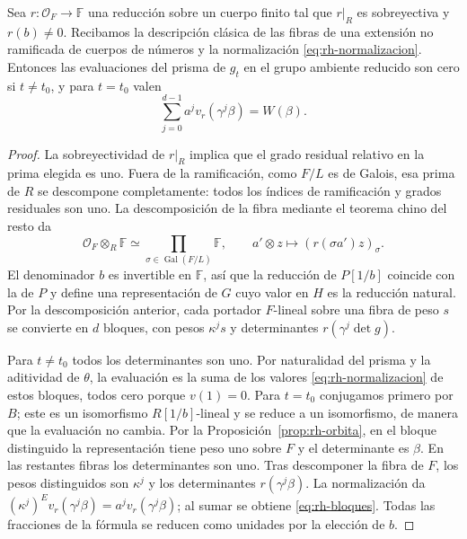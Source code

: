 \begin{proposicion}
\label{prop:rh-reduccion}
Sea $r:\mathcal O_F\to\mathbb F$ una reducción sobre un cuerpo finito tal que $r|_R$ es sobreyectiva y $r(b)\ne0$. Recibamos la descripción clásica de las fibras de una extensión no ramificada de cuerpos de números y la normalización \eqref{eq:rh-normalizacion}. Entonces las evaluaciones del prisma de $g_t$ en el grupo ambiente reducido son cero si $t\ne t_0$, y para $t=t_0$ valen
\begin{equation}
 \sum_{j=0}^{d-1}a^j v_r(\gamma^j\beta)=W(\beta).
 \label{eq:rh-bloques}
\end{equation}
\end{proposicion}
\begin{proof}
La sobreyectividad de $r|_R$ implica que el grado residual relativo en la prima elegida es uno. Fuera de la ramificación, como $F/L$ es de Galois, esa prima de $R$ se descompone completamente: todos los índices de ramificación y grados residuales son uno. La descomposición de la fibra mediante el teorema chino del resto da
\[
 \mathcal O_F\otimes_R\mathbb F\simeq
 \prod_{\sigma\in\operatorname{Gal}(F/L)}\mathbb F,
 \qquad a'\otimes z\longmapsto (r(\sigma a')z)_\sigma.
\]
El denominador $b$ es invertible en $\mathbb F$, así que la reducción de $P[1/b]$ coincide con la de $P$ y define una representación de $G$ cuyo valor en $H$ es la reducción natural. Por la descomposición anterior, cada portador $F$-lineal sobre una fibra de peso $s$ se convierte en $d$ bloques, con pesos $\kappa^j s$ y determinantes $r(\gamma^j\det g)$.

Para $t\ne t_0$ todos los determinantes son uno. Por naturalidad del prisma y la aditividad de $\theta$, la evaluación es la suma de los valores \eqref{eq:rh-normalizacion} de estos bloques, todos cero porque $v(1)=0$. Para $t=t_0$ conjugamos primero por $B$; este es un isomorfismo $R[1/b]$-lineal y se reduce a un isomorfismo, de manera que la evaluación no cambia. Por la Proposición~\ref{prop:rh-orbita}, en el bloque distinguido la representación tiene peso uno sobre $F$ y el determinante es $\beta$. En las restantes fibras los determinantes son uno. Tras descomponer la fibra de $F$, los pesos distinguidos son $\kappa^j$ y los determinantes $r(\gamma^j\beta)$. La normalización da $(\kappa^j)^E v_r(\gamma^j\beta)=a^j v_r(\gamma^j\beta)$; al sumar se obtiene \eqref{eq:rh-bloques}. Todas las fracciones de la fórmula se reducen como unidades por la elección de $b$.
\end{proof}

